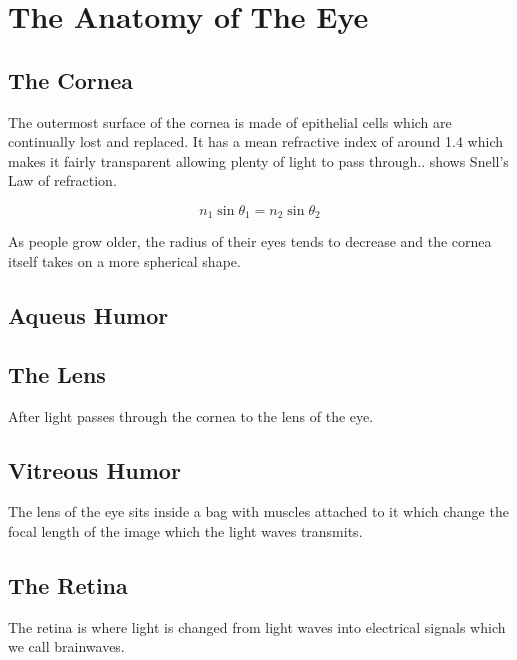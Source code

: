 
\chapter{The Anatomy of The Eye}

\label{anatomy} %


\section{The Cornea}


The outermost surface of the cornea is made of epithelial cells which
are continually lost and replaced.
\cite{jester1999cellular,hassell2010molecular} It has a mean refractive
index of around 1.4 which makes it fairly transparent allowing plenty
of light to pass through.\cite{thoft1983x, patel1994refractive}.  shows Snell's Law of refraction.

\begin{equation}
n_1\sin\theta_1=n_2\sin\theta_2
\label{eq:refractive}
\end{equation}


As people grow older, the radius of their eyes tends to decrease and the cornea itself takes on a more spherical shape.\cite{guirao2000optical}

\section{Aqueus Humor}

\section{The Lens}
After light passes through the cornea to the lens of the eye.

\section{Vitreous Humor}

The lens of the eye sits inside a bag with muscles attached to it which change
the focal length of the image which the light waves transmits.

\section{The Retina}
The retina is where light is changed from light waves into electrical signals
which we call brainwaves.

